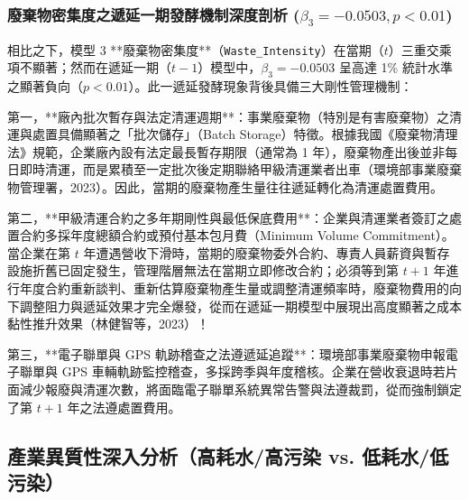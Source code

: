 \documentclass[12pt,a4paper]{article}
\begin{document}
\subsubsection{廢棄物密集度之遞延一期發酵機制深度剖析 \texorpdfstring{($\beta_3 = -0.0503, p < 0.01$)}{(beta3 = -0.0503, p < 0.01)}}

相比之下，模型 3 **廢棄物密集度**（\texttt{Waste\_Intensity}）在當期（$t$）三重交乘項不顯著；然而在遞延一期（$t-1$）模型中，$\beta_3 = -0.0503$ 呈高達 1\% 統計水準之顯著負向（$p < 0.01$）。此一遞延發酵現象背後具備三大剛性管理機制：

第一，**廠內批次暫存與法定清運週期**：事業廢棄物（特別是有害廢棄物）之清運與處置具備顯著之「批次儲存」（Batch Storage）特徵。根據我國《廢棄物清理法》規範，企業廠內設有法定最長暫存期限（通常為 1 年），廢棄物產出後並非每日即時清運，而是累積至一定批次後定期聯絡甲級清運業者出車（環境部事業廢棄物管理署，2023）。因此，當期的廢棄物產生量往往遞延轉化為清運處置費用。

第二，**甲級清運合約之多年期剛性與最低保底費用**：企業與清運業者簽訂之處置合約多採年度總額合約或預付基本包月費（Minimum Volume Commitment）。當企業在第 $t$ 年遭遇營收下滑時，當期的廢棄物委外合約、專責人員薪資與暫存設施折舊已固定發生，管理階層無法在當期立即修改合約；必須等到第 $t+1$ 年進行年度合約重新談判、重新估算廢棄物產生量或調整清運頻率時，廢棄物費用的向下調整阻力與遞延效果才完全爆發，從而在遞延一期模型中展現出高度顯著之成本黏性推升效果（林健智等，2023）！

第三，**電子聯單與 GPS 軌跡稽查之法遵遞延追蹤**：環境部事業廢棄物申報電子聯單與 GPS 車輛軌跡監控稽查，多採跨季與年度稽核。企業在營收衰退時若片面減少報廢與清運次數，將面臨電子聯單系統異常告警與法遵裁罰，從而強制鎖定了第 $t+1$ 年之法遵處置費用。

\subsection{產業異質性深入分析（高耗水/高污染 vs. 低耗水/低污染）}
\end{document}
